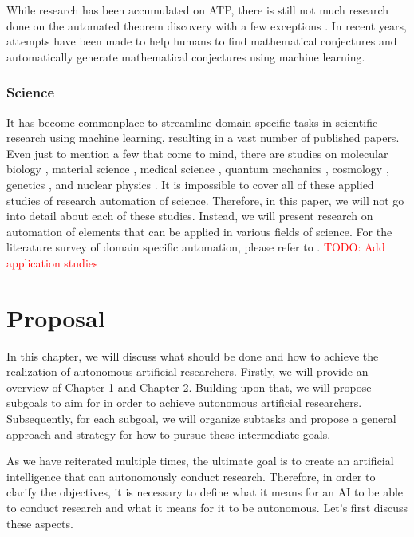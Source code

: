 \documentclass{book}
\begin{document}
 While research has been accumulated on ATP, there is still not much research done on the automated theorem discovery with a few exceptions \cite{gao2014systematic}. In recent years, attempts have been made to help humans to find mathematical conjectures \cite{davies2021advancing} and
 automatically generate mathematical conjectures \cite{raayoni2021generating}  using machine learning.

\subsection{Science}


It has become commonplace to streamline domain-specific tasks in scientific research using machine learning, resulting in a vast number of published papers. Even just to mention a few that come to mind, there are studies on molecular biology \cite{jumper2021highly,senior2020improved}, material science \cite{ramprasad2017machine}, medical science \cite{vamathevan2019applications,shorten2021deep}, quantum mechanics \cite{carleo2017solving}, cosmology \cite{carleo2019machine}, genetics \cite{libbrecht2015machine}, and nuclear physics \cite{degrave2022magnetic}. It is impossible to cover all of these applied studies of research automation of science. Therefore, in this paper, we will not go into detail about each of these studies. Instead, we will present research on automation of elements that can be applied in various fields of science. For the literature survey of domain specific automation, please refer to \cite{xu2021artificial}. \textcolor{red}{TODO: Add application studies}



\chapter{Proposal}
In this chapter, we will discuss what should be done and how to achieve the realization of autonomous artificial researchers. Firstly, we will provide an overview of Chapter 1 and Chapter 2. Building upon that, we will propose subgoals to aim for in order to achieve autonomous artificial researchers. Subsequently, for each subgoal, we will organize subtasks and propose a general approach and strategy for how to pursue these intermediate goals.

As we have reiterated multiple times, the ultimate goal is to create an artificial intelligence that can autonomously conduct research. Therefore, in order to clarify the objectives, it is necessary to define what it means for an AI to be able to conduct research and what it means for it to be autonomous. Let's first discuss these aspects.
\end{document}
